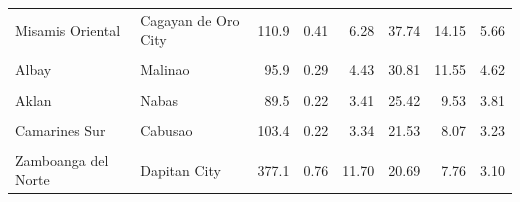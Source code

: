 \begin{table}[!h]
\begin{tabular}[t]{llrrrrrr}
Misamis Oriental & Cagayan de Oro City & 110.9 & 0.41 & 6.28 & 37.74 & 14.15 & 5.66\\
\cellcolor{gray!10}{Negros Occidental} & \cellcolor{gray!10}{Victorias City} & \cellcolor{gray!10}{113.8} & \cellcolor{gray!10}{0.37} & \cellcolor{gray!10}{5.76} & \cellcolor{gray!10}{33.75} & \cellcolor{gray!10}{12.66} & \cellcolor{gray!10}{5.06}\\
Albay & Malinao & 95.9 & 0.29 & 4.43 & 30.81 & 11.55 & 4.62\\
\cellcolor{gray!10}{Cebu} & \cellcolor{gray!10}{Bogo City} & \cellcolor{gray!10}{210.4} & \cellcolor{gray!10}{0.60} & \cellcolor{gray!10}{9.17} & \cellcolor{gray!10}{29.05} & \cellcolor{gray!10}{10.89} & \cellcolor{gray!10}{4.36}\\
\addlinespace
Aklan & Nabas & 89.5 & 0.22 & 3.41 & 25.42 & 9.53 & 3.81\\
\cellcolor{gray!10}{Pangasinan} & \cellcolor{gray!10}{Lingayen} & \cellcolor{gray!10}{299.6} & \cellcolor{gray!10}{0.69} & \cellcolor{gray!10}{10.57} & \cellcolor{gray!10}{23.52} & \cellcolor{gray!10}{8.82} & \cellcolor{gray!10}{3.53}\\
Camarines Sur & Cabusao & 103.4 & 0.22 & 3.34 & 21.53 & 8.07 & 3.23\\
\cellcolor{gray!10}{Negros Occidental} & \cellcolor{gray!10}{San Carlos City} & \cellcolor{gray!10}{154.8} & \cellcolor{gray!10}{0.31} & \cellcolor{gray!10}{4.83} & \cellcolor{gray!10}{20.79} & \cellcolor{gray!10}{7.80} & \cellcolor{gray!10}{3.12}\\
Zamboanga del Norte & Dapitan City & 377.1 & 0.76 & 11.70 & 20.69 & 7.76 & 3.10\\
\bottomrule
\end{tabular}
\end{table}
